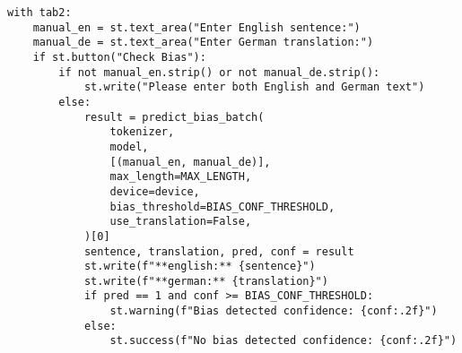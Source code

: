\begin{lstlisting}
with tab2:
    manual_en = st.text_area("Enter English sentence:")
    manual_de = st.text_area("Enter German translation:")
    if st.button("Check Bias"):
        if not manual_en.strip() or not manual_de.strip():
            st.write("Please enter both English and German text")
        else:
            result = predict_bias_batch(
                tokenizer,
                model,
                [(manual_en, manual_de)],
                max_length=MAX_LENGTH,
                device=device,
                bias_threshold=BIAS_CONF_THRESHOLD,
                use_translation=False,
            )[0]
            sentence, translation, pred, conf = result
            st.write(f"**english:** {sentence}")
            st.write(f"**german:** {translation}")
            if pred == 1 and conf >= BIAS_CONF_THRESHOLD:
                st.warning(f"Bias detected confidence: {conf:.2f}")
            else:
                st.success(f"No bias detected confidence: {conf:.2f}")
\end{lstlisting}
